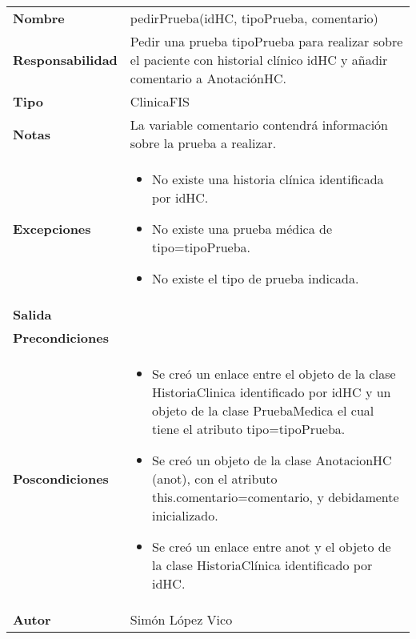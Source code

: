 \documentclass[11pt,a4paper]{article}
\newenvironment{itemizenomargins}
    {\begin{minipage}[t]{1\linewidth}\begin{itemize}}
    {\end{itemize}\end{minipage}}
\begin{document}
\begin{table}[H]
	\centering
	\label{my-label}
	\begin{tabularx}{\textwidth}{l|X}
		\textbf{Nombre}          & pedirPrueba(idHC, tipoPrueba, comentario) \\
		\textbf{Responsabilidad} & Pedir una prueba tipoPrueba para realizar sobre el paciente con historial clínico idHC y añadir comentario a AnotaciónHC.\\
		\textbf{Tipo}            & ClinicaFIS \\
		\textbf{Notas}           & La variable comentario contendrá información sobre la prueba a realizar. \\
		\textbf{Excepciones}     &
		\begin{itemizenomargins}
			\item No existe una historia clínica identificada por idHC.
			\item No existe una prueba médica de tipo=tipoPrueba.
			\item No existe el tipo de prueba indicada.
		\end{itemizenomargins} \\
		\textbf{Salida}          &  \\
		\textbf{Precondiciones}  &  \\
		\textbf{Poscondiciones}  &
		\begin{itemizenomargins}
			\item Se creó un enlace entre el objeto de la clase HistoriaClinica identificado por idHC y un objeto de la clase PruebaMedica el cual tiene el atributo tipo=tipoPrueba.
			\item Se creó un objeto de la clase AnotacionHC (anot), con el atributo this.comentario=comentario, y debidamente inicializado.
			\item Se creó un enlace entre anot y el objeto de la clase HistoriaClínica identificado por idHC.
		\end{itemizenomargins} \\
		\textbf{Autor}			 & Simón López Vico 
	\end{tabularx}
\end{table}
\end{document}
